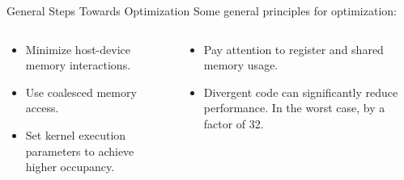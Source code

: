 \documentclass[9pt]{beamer}
\begin{document}
\begin{frame}{General Steps Towards Optimization}
Some general principles for optimization:
\begin{columns}

\begin{column}{0.5\textwidth}
\begin{itemize}

	\item Minimize host-device memory interactions.
    \medskip
	
    \item Use coalesced memory access. 
    \medskip
    
    \item Set kernel execution parameters to achieve higher occupancy. 

  

\end{itemize}

\pause

\end{column}

\begin{column}{0.5\textwidth}
\begin{itemize}
    \item Pay attention to register and shared memory usage. 
    
    \medskip
    \item Divergent code can significantly reduce performance. In the worst case, by a factor of 32.  	
\end{itemize}
\end{column}

\end{columns}
\end{frame}
\end{document}
